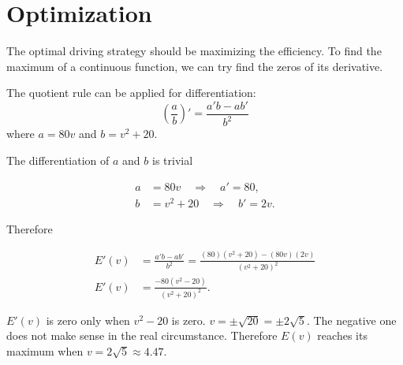 \documentclass[12pt]{article}
\begin{document}
\section{Optimization}

The optimal driving strategy should be maximizing the efficiency. To find the maximum of a continuous function, we can try find the zeros of its derivative.

The quotient rule can be applied for differentiation:
\begin{equation*}
\left( \frac{a}{b} \right)' = \frac{a'b - ab'}{b^2}
\end{equation*}
where $ a = 80v $ and $ b = v^2 + 20 $.

The differentiation of $a$ and $b$ is trivial

\begin{equation*}
\begin{aligned}
a &= 80v \quad \Rightarrow \quad a' = 80, \\
b &= v^2 + 20 \quad \Rightarrow \quad b' = 2v.
\end{aligned}
\end{equation*}

Therefore

\begin{equation*}
\begin{aligned}
    E'(v) &= \frac{a'b - ab'}{b^2} = \frac{(80)(v^2 + 20) - (80v)(2v)}{(v^2 + 20)^2} \\
    E'(v) &= \boxed{\frac{-80(v^2 - 20)}{(v^2 + 20)^2}}.
\end{aligned}
\end{equation*}

$E'(v)$ is zero only when $v^2 - 20$ is zero. $v = \pm\sqrt{20} = \pm{2\sqrt{5}}$. The negative one does not make sense in the real circumstance. Therefore $E(v)$ reaches its maximum when $v = 2\sqrt{5} \approx 4.47$.
\end{document}
